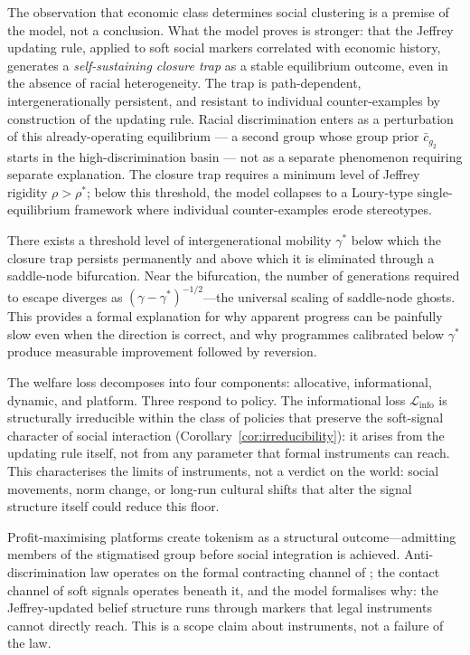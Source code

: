 \documentclass[12pt,a4paper]{article}
\theoremstyle{definition}
\numberwithin{proposition}{subsection}
\begin{document}
The observation that economic class determines social clustering is
a premise of the model, not a conclusion. What the model proves is
stronger: that the Jeffrey updating rule, applied to soft social
markers correlated with economic history, generates a
\emph{self-sustaining closure trap} as a stable equilibrium outcome,
even in the absence of racial heterogeneity. The trap is
path-dependent, intergenerationally persistent, and resistant to
individual counter-examples by construction of the updating rule.
Racial discrimination enters as a perturbation of this already-operating
equilibrium --- a second group whose group prior $\bar{c}_{g_2}$
starts in the high-discrimination basin --- not as a separate
phenomenon requiring separate explanation. The closure trap requires
a minimum level of Jeffrey rigidity $\rho > \rho^*$; below this
threshold, the model collapses to a Loury-type single-equilibrium
framework where individual counter-examples erode stereotypes.

There exists a threshold level of intergenerational mobility
$\gamma^*$ below which the closure trap persists permanently and
above which it is eliminated through a saddle-node bifurcation.
Near the bifurcation, the number of generations required to escape
diverges as $(\gamma - \gamma^*)^{-1/2}$---the universal scaling of
saddle-node ghosts. This provides a formal explanation for why
apparent progress can be painfully slow even when the direction is
correct, and why programmes calibrated below $\gamma^*$ produce
measurable improvement followed by reversion.

The welfare loss decomposes into four components: allocative,
informational, dynamic, and platform. Three respond to policy.
The informational loss $\mathcal{L}_{\text{info}}$ is structurally
irreducible within the class of policies that preserve the
soft-signal character of social interaction
(Corollary~\ref{cor:irreducibility}): it arises from the updating
rule itself, not from any parameter that formal instruments can
reach. This characterises the limits of instruments, not a verdict
on the world: social movements, norm change, or long-run cultural
shifts that alter the signal structure itself could reduce this
floor.

Profit-maximising platforms create tokenism as a structural
outcome---admitting members of the stigmatised group before social
integration is achieved. Anti-discrimination law operates on the
formal contracting channel of \citet{Loury2002}; the contact channel
of soft signals operates beneath it, and the model formalises why:
the Jeffrey-updated belief structure runs through markers that legal
instruments cannot directly reach. This is a scope claim about
instruments, not a failure of the law.
\end{document}
